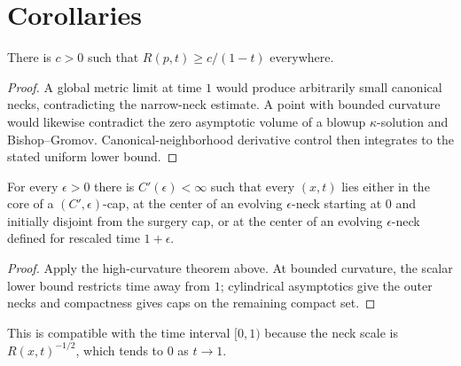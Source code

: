 \section{Corollaries}
\begin{proposition}
\label{prop:standard-solution-scalar-curvature-lower-bound}
\label{Restim}

There is $c>0$ such that $R(p,t)\ge c/(1-t)$ everywhere.
\end{proposition}
\begin{proof}
\sketch A global metric limit at time $1$ would produce arbitrarily small
canonical necks, contradicting the narrow-neck estimate. A point with bounded
curvature would likewise contradict the zero asymptotic volume of a blowup
$\kappa$-solution and Bishop--Gromov. Canonical-neighborhood derivative
control then integrates to the stated uniform lower bound.
\end{proof}

\begin{theorem}
\label{thm:standard-solution-trichotomy}
\label{stdsolncannbhd}

For every $\epsilon>0$ there is $C'(\epsilon)<\infty$ such that every
$(x,t)$ lies either in the core of a $(C',\epsilon)$-cap, at the center
of an evolving $\epsilon$-neck starting at $0$ and initially disjoint from
the surgery cap, or at the center of an evolving $\epsilon$-neck defined
for rescaled time $1+\epsilon$.
\end{theorem}
\begin{proof}
\sketch Apply the high-curvature theorem above. At bounded curvature, the
scalar lower bound restricts time away from $1$; cylindrical asymptotics give
the outer necks and compactness gives caps on the remaining compact set.
\end{proof}

\begin{remark}
\label{rem:evolving-neck-rescaled-time}

This is compatible with the time interval $[0,1)$ because the neck scale is
$R(x,t)^{-1/2}$, which tends to $0$ as $t\to1$.
\end{remark}

